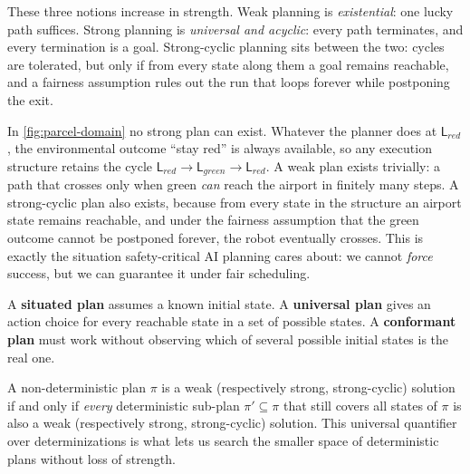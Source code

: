 These three notions increase in strength.  Weak planning is
\emph{existential}: one lucky path suffices.  Strong planning is
\emph{universal and acyclic}: every path terminates, and every
termination is a goal.  Strong-cyclic planning sits between the two:
cycles are tolerated, but only if from every state along them a goal
remains reachable, and a fairness assumption rules out the run that
loops forever while postponing the exit.

\begin{example}
\label{ex:parcel-plan-types}
In \cref{fig:parcel-domain} no strong plan can exist.  Whatever the
planner does at $\mathsf{L}_\mathit{red}$, the environmental outcome
``stay red'' is always available, so any execution structure retains
the cycle $\mathsf{L}_\mathit{red}\to\mathsf{L}_\mathit{green}\to\mathsf{L}_\mathit{red}$.
A weak plan exists trivially: a path that crosses only when green
\emph{can} reach the airport in finitely many steps.  A strong-cyclic
plan also exists, because from every state in the structure an airport
state remains reachable, and under the fairness assumption that the
green outcome cannot be postponed forever, the robot eventually crosses.
This is exactly the situation safety-critical AI planning cares about:
we cannot \emph{force} success, but we can guarantee it under fair
scheduling.
\end{example}

\begin{definition}
\label{def:planning-plan-types}
A \textbf{situated plan} assumes a known initial state.  A
\textbf{universal plan} gives an action choice for every reachable state
in a set of possible states.  A \textbf{conformant plan} must work
without observing which of several possible initial states is the real
one.
\end{definition}

\begin{remark}[Determinization]
\label{rem:determinization}
A non-deterministic plan $\pi$ is a weak (respectively strong,
strong-cyclic) solution if and only if \emph{every} deterministic
sub-plan $\pi'\subseteq\pi$ that still covers all states of $\pi$ is
also a weak (respectively strong, strong-cyclic) solution.  This
universal quantifier over determinizations is what lets us search the
smaller space of deterministic plans without loss of strength.
\end{remark}

